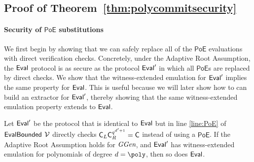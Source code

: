 \subsection{Proof of Theorem~\ref{thm:polycommitsecurity}}
\label{appendix:maintheoremproof}

\paragraph{Security of $\textsf{PoE}$ substitutions}
We first begin by showing that we can safely replace all of the $\textsf{PoE}$ evaluations with direct verification checks. Concretely, under the Adaptive Root Assumption, the $\textsf{{Eval}}$ protocol is as secure as the protocol $\textsf{{Eval}}'$ in which all $\textsf{PoE}$s are replaced by direct checks. We show that the witness-extended emulation for $\textsf{{Eval}}'$ implies the same property for $\textsf{{Eval}}$. This is useful because we will later show how to can build an extractor for $\textsf{{Eval}}'$, thereby showing that the same witness-extended emulation property extends to $\textsf{{Eval}}$.
\begin{lemma} \label{lemma:poe_security}
Let $\textsf{{Eval}}'$ be the protocol that is identical to $\textsf{{Eval}}$ but in line \ref{line:PoE} of $\textsf{{EvalBounded}}$ $\mathcal{V}$ directly checks $\mathsf{C}_L\mathsf{C}_R^{q^{d'+1}}=\mathsf{C}$ instead of using a $\textsf{PoE}$. If the Adaptive Root Assumption holds for $\textit{GGen}$, and $\textsf{{Eval}}'$ has witness-extended emulation for polynomials of degree $d=\poly$, then so does $\textsf{{Eval}}$.
\end{lemma}
